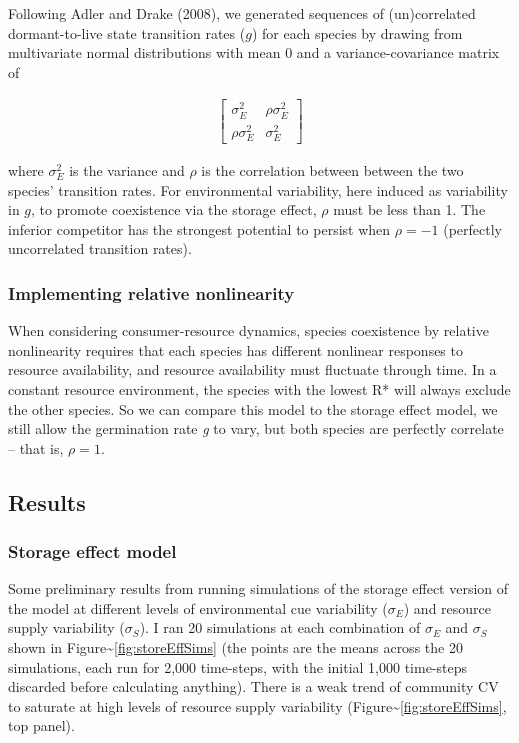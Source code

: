 \documentclass[12pt,]{article}
\begin{document}
Following Adler and Drake (2008), we generated sequences of
(un)correlated dormant-to-live state transition rates ($g$) for each
species by drawing from multivariate normal distributions with mean 0
and a variance-covariance matrix of

\begin{align}
\begin{bmatrix}
\sigma^2_{E} & \rho\sigma^2_{E} \\
\rho\sigma^2_{E} & \sigma^2_{E}
\end{bmatrix}
\end{align}

\noindent{}where $\sigma^2_{E}$ is the variance and $\rho$ is the
correlation between between the two species' transition rates. For
environmental variability, here induced as variability in $g$, to
promote coexistence via the storage effect, $\rho$ must be less than 1.
The inferior competitor has the strongest potential to persist when
$\rho=-1$ (perfectly uncorrelated transition rates).

\subsubsection{Implementing relative
nonlinearity}\label{implementing-relative-nonlinearity}

When considering consumer-resource dynamics, species coexistence by
relative nonlinearity requires that each species has different nonlinear
responses to resource availability, and resource availability must
fluctuate through time. In a constant resource environment, the species
with the lowest R* will always exclude the other species. So we can
compare this model to the storage effect model, we still allow the
germination rate \emph{g} to vary, but both species are perfectly
correlate -- that is, $\rho=1$.

\subsection{Results}\label{results}

\subsubsection{Storage effect model}\label{storage-effect-model}

Some preliminary results from running simulations of the storage effect
version of the model at different levels of environmental cue
variability ($\sigma_{E}$) and resource supply variability
($\sigma_{S}$). I ran 20 simulations at each combination of $\sigma_{E}$
and $\sigma_{S}$ shown in Figure\textasciitilde{}\ref{fig:storeEffSims}
(the points are the means across the 20 simulations, each run for 2,000
time-steps, with the initial 1,000 time-steps discarded before
calculating anything). There is a weak trend of community CV to saturate
at high levels of resource supply variability
(Figure\textasciitilde{}\ref{fig:storeEffSims}, top panel).
\end{document}
